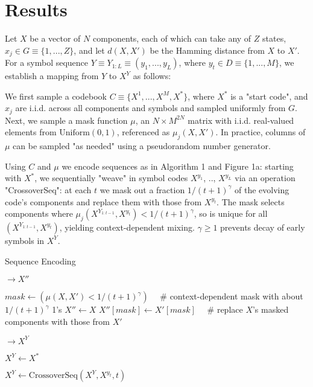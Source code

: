 \documentclass{article}
\begin{document}
\section{Results}

Let $X$ be a vector of $N$ components, each of which can take any of $Z$ states, $x_j \in G \equiv \{1,...,Z\}$, and let $d(X, X')$ be the Hamming distance from $X$ to $X'$. For a symbol sequence $Y \equiv Y_{1:L} \equiv (y_1, ..., y_L)$, where $y_t \in D \equiv \{1, ..., M\}$, we establish a mapping from $Y$ to $X^Y$ as follows:

We first sample a codebook $C \equiv \{X^1, ..., X^M, X^*\}$, where $X^*$ is a "start code", and $x_j$ are i.i.d. across all components and symbols and sampled uniformly from $G$. Next, we sample a mask function $\mu$, an $N \times M^{2N}$ matrix with i.i.d. real-valued elements from $\textrm{Uniform}(0, 1)$, referenced as $\mu_j(X, X')$. In practice, columns of $\mu$ can be sampled "as needed" using a pseudorandom number generator.

Using $C$ and $\mu$ we encode sequences as in Algorithm 1 and Figure 1a: starting with $X^*$, we sequentially "weave" in symbol codes $X^{y_1}$, .., $X^{y_L}$ via an operation "CrossoverSeq": at each $t$ we mask out a fraction $1/(t+1)^\gamma$ of the evolving code's components and replace them with those from $X^{y_t}$. The mask selects components where $\mu_j(X^{Y_{1:t-1}}, X^{y_t}) < 1/(t+1)^\gamma$, so is unique for all $(X^{Y_{1:t-1}}, X^{y_t})$, yielding context-dependent mixing. $\gamma \geq 1$ prevents decay of early symbols in $X^Y$.

\begin{algorithm}
\caption{Sequence Encoding}
\label{alg:1}

\begin{algorithmic}[0]
 $\rightarrow X''$

\State $mask \gets (\mu(X, X') < 1/(t+1)^\gamma) \quad$  \# context-dependent mask with about $1/(t+1)^\gamma$ 1's
\State $X'' \gets X$
\State $X''[mask] \gets X'[mask] \quad$  \# replace $X$'s masked components with those from $X'$

\EndFunction

 $\rightarrow X^Y$

\State $X^Y \gets X^*$

\State $X^Y \gets \textrm{CrossoverSeq}(X^Y, X^{y_t}, t)$

\EndFor

\EndFunction

\end{algorithmic}
\end{algorithm}
\end{document}
